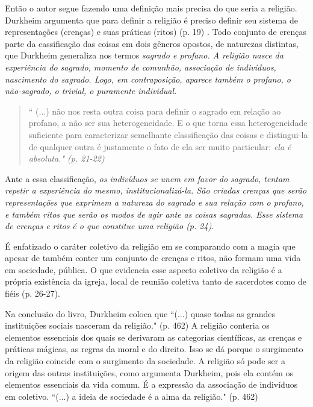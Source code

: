 \documentclass[12pt,a4paper]{article}
\begin{document}
Então o autor segue fazendo uma definição mais precisa do que seria a religião. Durkheim argumenta que para definir a religião é preciso definir seu sistema de representações (crenças) e suas práticas (ritos) (p. 19) . Todo conjunto de crenças parte da cassificação das coisas em dois gêneros opostos, de naturezas distintas, que Durkheim generaliza nos termos \em sagrado \em e \em profano\em . A religião nasce da experiência do sagrado, momento de comunhão, associação de indivíduos, nascimento do sagrado. Logo, em contraposição, aparece também o profano, o não-sagrado, o trivial, o puramente individual.
\begin{quote}
    `` (...) não nos resta outra coisa para definir o sagrado em relação ao profano, a não ser sua heterogeneidade. E o que torna essa heterogeneidade suficiente para caracterizar semelhante classificação das coisas e distingui-la de qualquer outra é justamente o fato de ela ser muito particular: \em ela é absoluta\em ." (p. 21-22)
\end{quote}
Ante a essa classificação, \em os indivíduos se unem em favor do sagrado\em , tentam repetir a experiência do mesmo, institucionalizá-la. São criadas crenças que serão representações que exprimem a natureza do sagrado e sua relação com o profano, e também ritos que serão os modos de agir ante as coisas sagradas. Esse sistema de crenças e ritos é o que constitue uma religião (p. 24).

É enfatizado o caráter coletivo da religião em se comparando com a magia que apesar de também conter um conjunto de crenças e ritos, não formam uma vida em sociedade, pública. O que evidencia esse aspecto coletivo da religião é a própria existência da igreja, local de reunião coletiva tanto de sacerdotes como de fiéis (p. 26-27).


Na conclusão do livro, Durkheim coloca que ``(...) quase todas as grandes instituições sociais nasceram da religião."
(p. 462)
A religião conteria os elementos essenciais dos quais se derivaram as categorias científicas, as crenças e práticas mágicas, as regras da moral e do direito. Isso se dá porque o surgimento da religião coincide com o surgimento da sociedade. A religião só pode ser a origem das outras instituições, como argumenta Durkheim, pois ela contém os elementos essenciais da vida comum. É a expressão da associação de indivíduos em coletivo. ``(...) a ideia de sociedade é a alma da religião." (p. 462)
\end{document}
